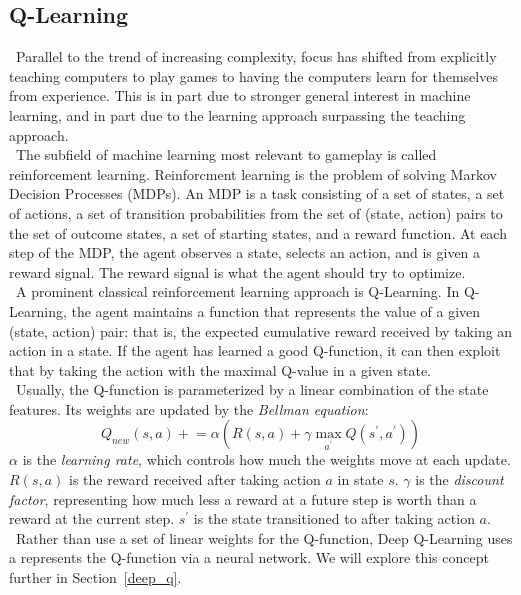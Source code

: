 \documentclass[conference]{IEEEtran}
\begin{document}
\subsection{Q-Learning}\label{ql}
\noindent\ Parallel to the trend of increasing complexity, focus has shifted from explicitly
teaching computers to play games to having the computers learn for themselves from
experience. This is in part due to stronger general interest in machine learning, and in
part due to the learning approach surpassing the teaching approach.\\
\indent\ The subfield of machine learning most relevant to gameplay is called reinforcement
learning. Reinforcment learning is the problem of solving Markov Decision Processes (MDPs).
An MDP is a task consisting of a set of states, a set of actions, a set of transition
probabilities from the set of (state, action) pairs to the set of outcome states, a set
of starting states, and a reward function. At each step of the MDP, the agent observes a
state, selects an action, and is given a reward signal. The reward signal is what the agent
should try to optimize.\\
\indent\ A prominent classical reinforcement learning approach is Q-Learning. In Q-Learning,
the agent maintains a function that represents the value of a given (state, action) pair:
that is, the expected cumulative reward received by taking an action in a state. If the
agent has learned a good Q-function, it can then exploit that by taking the action with the
maximal Q-value in a given state.\\
\indent\ Usually, the Q-function is parameterized by a linear combination of the state
features. Its weights are updated by the \emph{Bellman equation}:
\begin{equation}
    Q_{new}(s, a)\mathrel{+}=\alpha\left(R(s,a)+\gamma\max_{a^{'}}Q(s^{'},a^{'})\right)
\end{equation}
$\alpha$ is the \emph{learning rate}, which controls how much the weights move at each update.
$R(s, a)$ is the reward received after taking action $a$ in state $s$.
$\gamma$ is the \emph{discount factor}, representing how much less a reward at a future step
is worth than a reward at the current step. $s^{'}$ is the state transitioned to after taking
action $a$.\\
\indent\ Rather than use a set of linear weights for the Q-function, Deep Q-Learning uses a
represents the Q-function via a neural network. We will explore this concept further in
Section~\ref{deep_q}.
\end{document}
